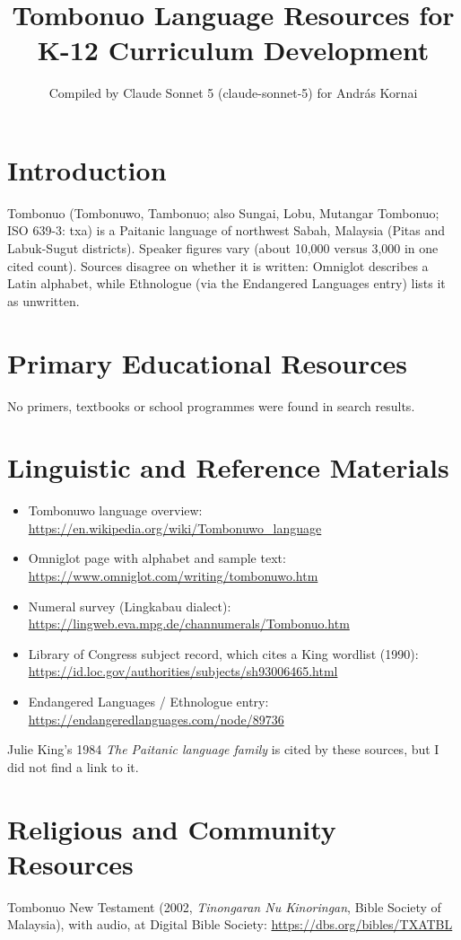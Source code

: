 \documentclass[12pt]{article}
\title{Tombonuo Language Resources for K-12 Curriculum Development}
\author{Compiled by Claude Sonnet 5 (claude-sonnet-5) for Andr\'as Kornai}
\date{}
\begin{document}
\maketitle

\section{Introduction}
Tombonuo (Tombonuwo, Tambonuo; also Sungai, Lobu, Mutangar Tombonuo; ISO 639-3: txa) is a Paitanic language of northwest Sabah, Malaysia (Pitas and Labuk-Sugut districts). Speaker figures vary (about 10,000 versus 3,000 in one cited count). Sources disagree on whether it is written: Omniglot describes a Latin alphabet, while Ethnologue (via the Endangered Languages entry) lists it as unwritten.

\section{Primary Educational Resources}
No primers, textbooks or school programmes were found in search results.

\section{Linguistic and Reference Materials}
\begin{itemize}
\item Tombonuwo language overview: \url{https://en.wikipedia.org/wiki/Tombonuwo_language}
\item Omniglot page with alphabet and sample text: \url{https://www.omniglot.com/writing/tombonuwo.htm}
\item Numeral survey (Lingkabau dialect): \url{https://lingweb.eva.mpg.de/channumerals/Tombonuo.htm}
\item Library of Congress subject record, which cites a King wordlist (1990): \url{https://id.loc.gov/authorities/subjects/sh93006465.html}
\item Endangered Languages / Ethnologue entry: \url{https://endangeredlanguages.com/node/89736}
\end{itemize}
Julie King's 1984 \emph{The Paitanic language family} is cited by these sources, but I did not find a link to it.

\section{Religious and Community Resources}
Tombonuo New Testament (2002, \emph{Tinongaran Nu Kinoringan}, Bible Society of Malaysia), with audio, at Digital Bible Society: \url{https://dbs.org/bibles/TXATBL}
\end{document}
